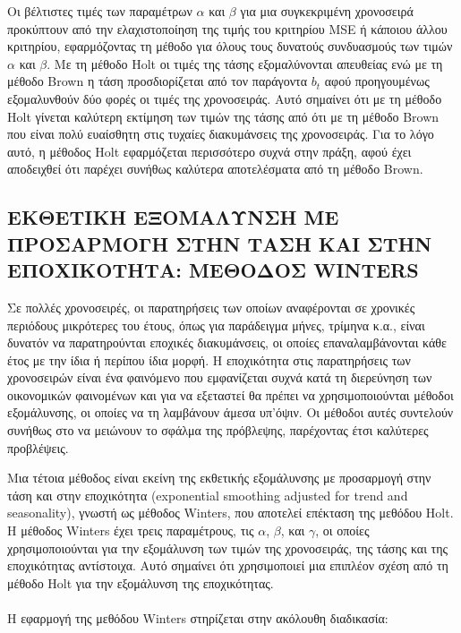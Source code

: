 Οι βέλτιστες τιμές των παραμέτρων $ \alpha $ και $ \beta $ για μια συγκεκριμένη χρονοσειρά
προκύπτουν από την ελαχιστοποίηση της τιμής του κριτηρίου MSE ή κάποιου άλλου
κριτηρίου, εφαρμόζοντας τη μέθοδο για όλους τους δυνατούς συνδυασμούς των
τιμών $ \alpha $ και $ \beta $. Με τη μέθοδο Holt οι τιμές της τάσης εξομαλύνονται απευθείας ενώ με
τη μέθοδο Brown η τάση προσδιορίζεται από τον παράγοντα $b_t$ αφού προηγουμένως
εξομαλυνθούν δύο φορές οι τιμές της χρονοσειράς. Αυτό σημαίνει ότι με τη μέθοδο
Holt γίνεται καλύτερη εκτίμηση των τιμών της τάσης από ότι με τη μέθοδο Brown
που είναι πολύ ευαίσθητη στις τυχαίες διακυμάνσεις της χρονοσειράς. Για το λόγο
αυτό, η μέθοδος Holt εφαρμόζεται περισσότερο συχνά στην πράξη, αφού έχει
αποδειχθεί ότι παρέχει συνήθως καλύτερα αποτελέσματα από τη μέθοδο Brown.

\subsection{ΕΚΘΕΤΙΚΗ ΕΞΟΜΑΛΥΝΣΗ ΜΕ ΠΡΟΣΑΡΜΟΓΗ ΣΤΗΝ ΤΑΣΗ ΚΑΙ ΣΤΗΝ ΕΠΟΧΙΚΟΤΗΤΑ:  ΜΕΘΟΔΟΣ WINTERS}
Σε πολλές χρονοσειρές, οι παρατηρήσεις των οποίων αναφέρονται σε χρονικές
περιόδους μικρότερες του έτους, όπως για παράδειγμα μήνες, τρίμηνα κ.α., είναι
δυνατόν να παρατηρούνται εποχικές διακυμάνσεις, οι οποίες επαναλαμβάνονται κάθε
έτος με την ίδια ή περίπου ίδια μορφή. Η εποχικότητα στις παρατηρήσεις των
χρονοσειρών είναι ένα φαινόμενο που εμφανίζεται συχνά κατά τη διερεύνηση των
οικονομικών φαινομένων και για να εξεταστεί θα πρέπει να χρησιμοποιούνται
μέθοδοι εξομάλυνσης, οι οποίες να τη λαμβάνουν άμεσα υπ’όψιν. Οι μέθοδοι αυτές
συντελούν συνήθως στο να μειώνουν το σφάλμα της πρόβλεψης, παρέχοντας έτσι
καλύτερες προβλέψεις.

Μια τέτοια μέθοδος είναι εκείνη της εκθετικής εξομάλυνσης με προσαρμογή στην
τάση και στην εποχικότητα (exponential smoothing adjusted for trend and
seasonality), γνωστή ως μέθοδος Winters, που αποτελεί επέκταση της μεθόδου Holt.
Η μέθοδος Winters έχει τρεις παραμέτρους, τις $ \alpha$, $\beta$, και $\gamma$, οι οποίες
χρησιμοποιούνται για την εξομάλυνση των τιμών της χρονοσειράς, της τάσης και της
εποχικότητας αντίστοιχα. Αυτό σημαίνει ότι χρησιμοποιεί μια επιπλέον σχέση από τη
μέθοδο Holt για την εξομάλυνση της εποχικότητας.\\\\
Η εφαρμογή της μεθόδου Winters στηρίζεται στην ακόλουθη διαδικασία:\\


